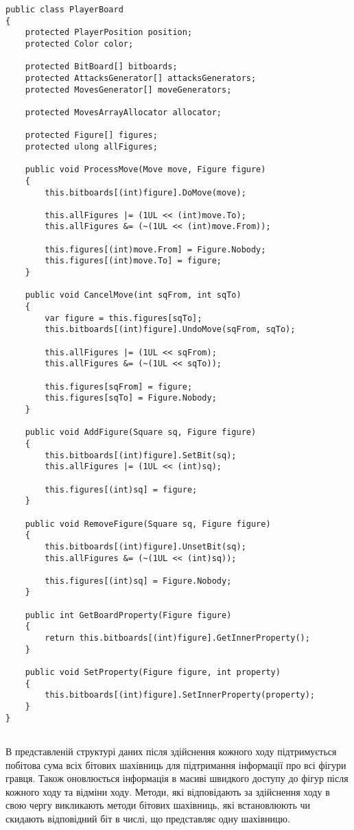 \documentclass[12pt,a4paper]{article}
\begin{document}
\begin{lstlisting}
public class PlayerBoard
{
    protected PlayerPosition position;	
    protected Color color;

    protected BitBoard[] bitboards;
    protected AttacksGenerator[] attacksGenerators;
    protected MovesGenerator[] moveGenerators;

    protected MovesArrayAllocator allocator;

    protected Figure[] figures;
    protected ulong allFigures;

    public void ProcessMove(Move move, Figure figure)
    {
        this.bitboards[(int)figure].DoMove(move);

        this.allFigures |= (1UL << (int)move.To);
        this.allFigures &= (~(1UL << (int)move.From));

        this.figures[(int)move.From] = Figure.Nobody;
        this.figures[(int)move.To] = figure;
    }

    public void CancelMove(int sqFrom, int sqTo)
    {
        var figure = this.figures[sqTo];
        this.bitboards[(int)figure].UndoMove(sqFrom, sqTo);

        this.allFigures |= (1UL << sqFrom);
        this.allFigures &= (~(1UL << sqTo));

        this.figures[sqFrom] = figure;
        this.figures[sqTo] = Figure.Nobody;
    }

    public void AddFigure(Square sq, Figure figure)
    {
        this.bitboards[(int)figure].SetBit(sq);
        this.allFigures |= (1UL << (int)sq);

        this.figures[(int)sq] = figure;
    }

    public void RemoveFigure(Square sq, Figure figure)
    {			
        this.bitboards[(int)figure].UnsetBit(sq);
        this.allFigures &= (~(1UL << (int)sq));

        this.figures[(int)sq] = Figure.Nobody;
    }

    public int GetBoardProperty(Figure figure)
    {
        return this.bitboards[(int)figure].GetInnerProperty();
    }

    public void SetProperty(Figure figure, int property)
    {
        this.bitboards[(int)figure].SetInnerProperty(property);
    }
}
	
\end{lstlisting}

\fontsize{14pt}{6mm}\selectfont

В представленій структурі даних після здійснення кожного ходу підтримується
побітова сума всіх бітових шахівниць для підтримання інформації про всі фігури
гравця. Також оновлюється інформація в масиві швидкого доступу до фігур після
кожного ходу та відміни ходу. Методи, які відповідають за здійснення ходу в
свою чергу викликають методи бітових шахівниць, які встановлюють чи скидають
відповідний біт в числі, що представляє одну шахівницю.
\end{document}
